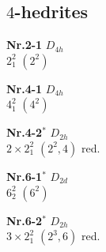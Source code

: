 \documentclass[12pt]{article}
\begin{document}
\subsection{$4$-hedrites}\label{subsection-4-hedrites}
{\small
\setlength{\unitlength}{1cm}
\begin{minipage}[t]{3.5cm}
\centering
\epsfxsize=2.5cm
\par
{{\bf Nr.2-1} \quad $D_{4h}$\\ $2^2_1$ \quad $(2^2)$\\\vspace{3mm} }
\end{minipage}
\setlength{\unitlength}{1cm}
\begin{minipage}[t]{3.5cm}
\centering
\epsfxsize=2.5cm
\par
{{\bf Nr.4-1} \quad $D_{4h}$\\ $4^2_1$ \quad $(4^2)$\\\vspace{3mm} }
\end{minipage}
\setlength{\unitlength}{1cm}
\begin{minipage}[t]{3.5cm}
\centering
\epsfxsize=2.5cm
\par
{{\bf Nr.4-2${}^*$} \quad $D_{2h}$\\ $2\times 2^2_1$ \quad $(2^2,4)$ red.\\\vspace{3mm} }
\end{minipage}
\setlength{\unitlength}{1cm}
\begin{minipage}[t]{3.5cm}
\centering
\epsfxsize=2.5cm
\par
{{\bf Nr.6-1${}^*$} \quad $D_{2d}$\\ $6^2_2$ \quad $(6^2)$\\\vspace{3mm} }
\end{minipage}
\setlength{\unitlength}{1cm}
\begin{minipage}[t]{3.5cm}
\centering
\epsfxsize=2.5cm
\par
{{\bf Nr.6-2${}^*$} \quad $D_{2h}$\\ $3\times 2^2_1$ \quad $(2^3,6)$ red.\\\vspace{3mm} }
\end{minipage}
\setlength{\unitlength}{1cm}
\begin{minipage}[t]{3.5cm}
\centering
\epsfxsize=2.5cm
\par

\end{minipage}}
\end{document}
